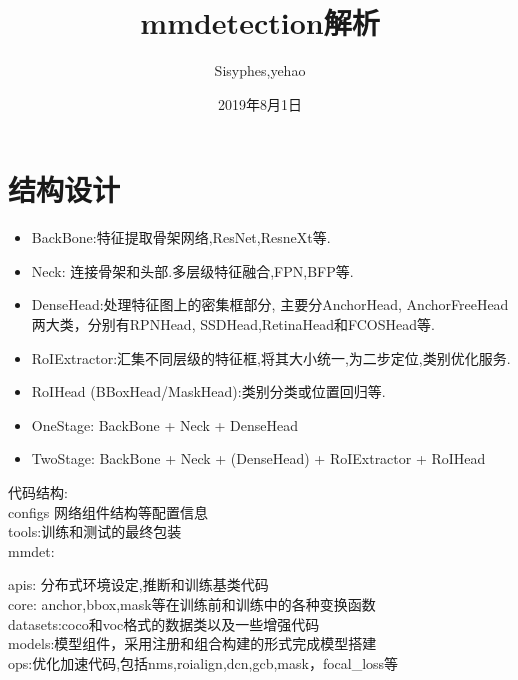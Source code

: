 \documentclass[UTF8]{ctexart}
\title{mmdetection解析}
\author{Sisyphes,yehao}
\date{2019年8月1日}
\begin{document}
\maketitle
\tableofcontents
\newpage

% 
% 
\section{结构设计}
\begin{itemize}
	\item BackBone:特征提取骨架网络,ResNet,ResneXt等.
	\item Neck: 连接骨架和头部.多层级特征融合,FPN,BFP等.
	\item DenseHead:处理特征图上的密集框部分, 主要分AnchorHead, AnchorFreeHead两大类，分别有RPNHead, SSDHead,RetinaHead和FCOSHead等.
	\item RoIExtractor:汇集不同层级的特征框,将其大小统一,为二步定位,类别优化服务.
	\item RoIHead (BBoxHead/MaskHead):类别分类或位置回归等.
	\item OneStage: BackBone + Neck + DenseHead
	\item TwoStage: BackBone + Neck  + (DenseHead) + RoIExtractor + RoIHead
	
\end{itemize}


\noindent 代码结构:\\
configs 网络组件结构等配置信息\\
tools:训练和测试的最终包装\\
mmdet:
\begin{adjustwidth}{0.5cm}{0cm}
	apis: 分布式环境设定,推断和训练基类代码\\
	core: anchor,bbox,mask等在训练前和训练中的各种变换函数\\
	datasets:coco和voc格式的数据类以及一些增强代码\\
	models:模型组件，采用注册和组合构建的形式完成模型搭建\\
	ops:优化加速代码,包括nms,roialign,dcn,gcb,mask，focal\_loss等\\
\end{adjustwidth}
\end{document}
